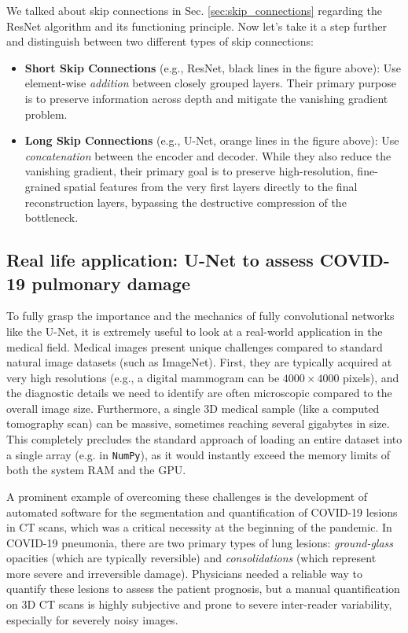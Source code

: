We talked about skip connections in Sec. \ref{sec:skip_connections} regarding the ResNet algorithm and its functioning principle. Now let's take it a step further and distinguish between two different types of skip connections:
\begin{itemize}
    \item[-] \textbf{Short Skip Connections} (e.g., ResNet, black lines in the figure above): Use element-wise \textit{addition} between closely grouped layers. Their primary purpose is to preserve information across depth and mitigate the vanishing gradient problem.
    \item[-] \textbf{Long Skip Connections} (e.g., U-Net, orange lines in the figure above): Use \textit{concatenation} between the encoder and decoder. While they also reduce the vanishing gradient, their primary goal is to preserve high-resolution, fine-grained spatial features from the very first layers directly to the final reconstruction layers, bypassing the destructive compression of the bottleneck.
\end{itemize}

\subsection{Real life application: U-Net to assess COVID-19 pulmonary damage}

To fully grasp the importance and the mechanics of fully convolutional networks like the U-Net, it is extremely useful to look at a real-world application in the medical field. Medical images present unique challenges compared to standard natural image datasets (such as ImageNet). First, they are typically acquired at very high resolutions (e.g., a digital mammogram can be $4000 \times 4000$ pixels), and the diagnostic details we need to identify are often microscopic compared to the overall image size. Furthermore, a single 3D medical sample (like a computed tomography scan) can be massive, sometimes reaching several gigabytes in size. This completely precludes the standard approach of loading an entire dataset into a single array (e.g. in \texttt{NumPy}), as it would instantly exceed the memory limits of both the system RAM and the GPU.

A prominent example of overcoming these challenges is the development of automated software for the segmentation and quantification of COVID-19 lesions in CT scans, which was a critical necessity at the beginning of the pandemic. In COVID-19 pneumonia, there are two primary types of lung lesions: \textit{ground-glass} opacities (which are typically reversible) and \textit{consolidations} (which represent more severe and irreversible damage). Physicians needed a reliable way to quantify these lesions to assess the patient prognosis, but a manual quantification on 3D CT scans is highly subjective and prone to severe inter-reader variability, especially for severely noisy images.

